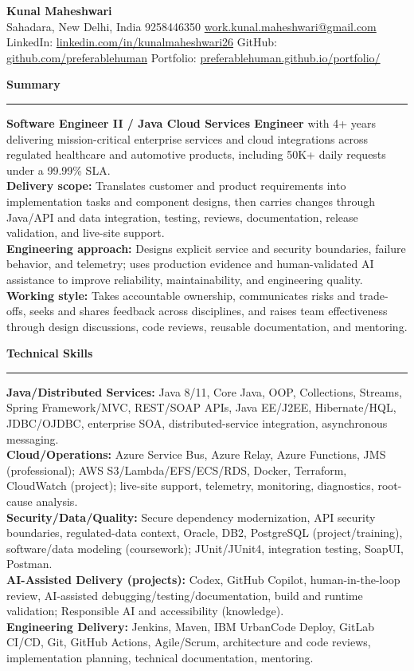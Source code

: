 \documentclass[11pt,letterpaper]{article}
\newcommand{\ressection}[1]{\Needspace{6\baselineskip}\vspace{8pt}\par\textbf{#1}\par\vspace{2pt}\hrule\vspace{5pt}}
\begin{document}
\pagestyle{empty}\raggedright\fontsize{11}{12.5}\selectfont

{\Large \textbf{Kunal Maheshwari}}\\
Sahadara, New Delhi, India \textbar{} 9258446350 \textbar{} \href{mailto:work.kunal.maheshwari@gmail.com}{work.kunal.maheshwari@gmail.com}\\
LinkedIn: \href{https://www.linkedin.com/in/kunalmaheshwari26}{linkedin.com/in/kunalmaheshwari26} \textbar{} GitHub: \href{https://github.com/preferablehuman}{github.com/preferablehuman} \textbar{} Portfolio: \href{https://preferablehuman.github.io/portfolio/}{preferablehuman.github.io/portfolio/}

\ressection{Summary}
\textbf{Software Engineer II / Java Cloud Services Engineer} with 4+ years delivering mission-critical enterprise services and cloud integrations across regulated healthcare and automotive products, including 50K+ daily requests under a 99.99\% SLA.\\[2pt]
\textbf{Delivery scope:} Translates customer and product requirements into implementation tasks and component designs, then carries changes through Java/API and data integration, testing, reviews, documentation, release validation, and live-site support.\\[2pt]
\textbf{Engineering approach:} Designs explicit service and security boundaries, failure behavior, and telemetry; uses production evidence and human-validated AI assistance to improve reliability, maintainability, and engineering quality.\\[2pt]
\textbf{Working style:} Takes accountable ownership, communicates risks and trade-offs, seeks and shares feedback across disciplines, and raises team effectiveness through design discussions, code reviews, reusable documentation, and mentoring.

\ressection{Technical Skills}
\textbf{Java/Distributed Services:} Java 8/11, Core Java, OOP, Collections, Streams, Spring Framework/MVC, REST/SOAP APIs, Java EE/J2EE, Hibernate/HQL, JDBC/OJDBC, enterprise SOA, distributed-service integration, asynchronous messaging.\\
\textbf{Cloud/Operations:} Azure Service Bus, Azure Relay, Azure Functions, JMS (professional); AWS S3/Lambda/EFS/ECS/RDS, Docker, Terraform, CloudWatch (project); live-site support, telemetry, monitoring, diagnostics, root-cause analysis.\\
\textbf{Security/Data/Quality:} Secure dependency modernization, API security boundaries, regulated-data context, Oracle, DB2, PostgreSQL (project/training), software/data modeling (coursework); JUnit/JUnit4, integration testing, SoapUI, Postman.\\
\textbf{AI-Assisted Delivery (projects):} Codex, GitHub Copilot, human-in-the-loop review, AI-assisted debugging/testing/documentation, build and runtime validation; Responsible AI and accessibility (knowledge).\\
\textbf{Engineering Delivery:} Jenkins, Maven, IBM UrbanCode Deploy, GitLab CI/CD, Git, GitHub Actions, Agile/Scrum, architecture and code reviews, implementation planning, technical documentation, mentoring.
\end{document}
